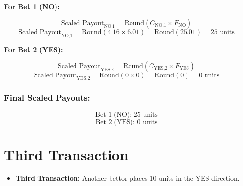 \documentclass{article}
\begin{document}
\textbf{For Bet 1 (NO):}

\[
\text{Scaled Payout}_{\text{NO,1}} = \text{Round}(C_{\text{NO,1}} \times F_{\text{NO}})
\]
\[
\text{Scaled Payout}_{\text{NO,1}} = \text{Round}(4.16 \times 6.01) = \text{Round}(25.01) = 25 \text{ units}
\]

\textbf{For Bet 2 (YES):}

\[
\text{Scaled Payout}_{\text{YES,2}} = \text{Round}(C_{\text{YES,2}} \times F_{\text{YES}})
\]
\[
\text{Scaled Payout}_{\text{YES,2}} = \text{Round}(0 \times 0) = \text{Round}(0) = 0 \text{ units}
\]

\subsubsection*{Final Scaled Payouts:}
\[
\text{Bet 1 (NO): } 25 \text{ units}
\]
\[
\text{Bet 2 (YES): } 0 \text{ units}
\]

\begin{center}
\end{center}


\begin{center}
\end{center}

\newpage

\section{Third Transaction}

\begin{itemize}
    \item \textbf{Third Transaction:} Another bettor places 10 units in the YES direction.
\end{itemize}
\end{document}

